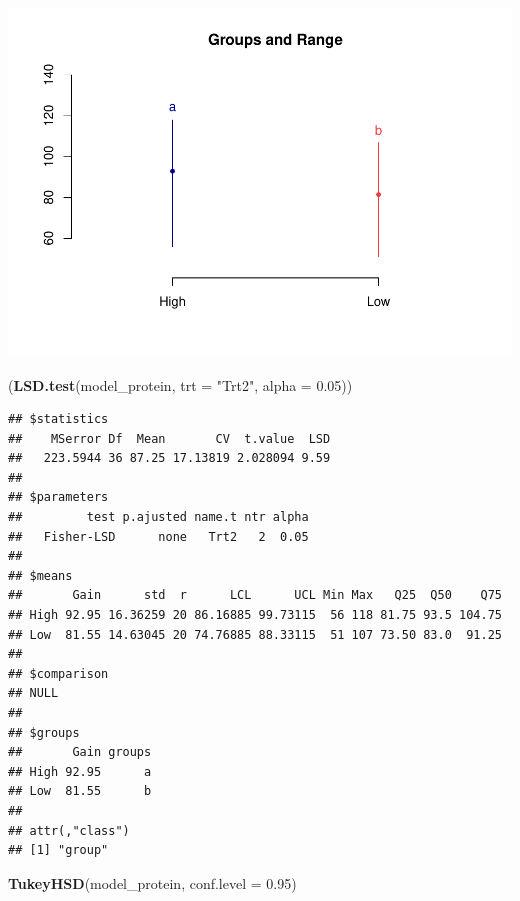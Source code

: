 \documentclass[11pt,]{article}
\newenvironment{Shaded}{\begin{snugshade}}{\end{snugshade}}
\newcommand{\DataTypeTok}[1]{\textcolor[rgb]{0.13,0.29,0.53}{#1}}
\newcommand{\FloatTok}[1]{\textcolor[rgb]{0.00,0.00,0.81}{#1}}
\newcommand{\KeywordTok}[1]{\textcolor[rgb]{0.13,0.29,0.53}{\textbf{#1}}}
\newcommand{\NormalTok}[1]{#1}
\newcommand{\StringTok}[1]{\textcolor[rgb]{0.31,0.60,0.02}{#1}}
\begin{document}
\includegraphics{svm-rmarkdown-article-example_files/figure-latex/unnamed-chunk-6-1.pdf}

\begin{Shaded}
\begin{Highlighting}[]
\NormalTok{(}\KeywordTok{LSD.test}\NormalTok{(model_protein, }\DataTypeTok{trt =} \StringTok{"Trt2"}\NormalTok{, }\DataTypeTok{alpha =} \FloatTok{0.05}\NormalTok{))}
\end{Highlighting}
\end{Shaded}

\begin{verbatim}
## $statistics
##    MSerror Df  Mean       CV  t.value  LSD
##   223.5944 36 87.25 17.13819 2.028094 9.59
## 
## $parameters
##         test p.ajusted name.t ntr alpha
##   Fisher-LSD      none   Trt2   2  0.05
## 
## $means
##       Gain      std  r      LCL      UCL Min Max   Q25  Q50    Q75
## High 92.95 16.36259 20 86.16885 99.73115  56 118 81.75 93.5 104.75
## Low  81.55 14.63045 20 74.76885 88.33115  51 107 73.50 83.0  91.25
## 
## $comparison
## NULL
## 
## $groups
##       Gain groups
## High 92.95      a
## Low  81.55      b
## 
## attr(,"class")
## [1] "group"
\end{verbatim}

\begin{Shaded}
\begin{Highlighting}[]
\KeywordTok{TukeyHSD}\NormalTok{(model_protein, }\DataTypeTok{conf.level =} \FloatTok{0.95}\NormalTok{)}
\end{Highlighting}
\end{Shaded}
\end{document}
